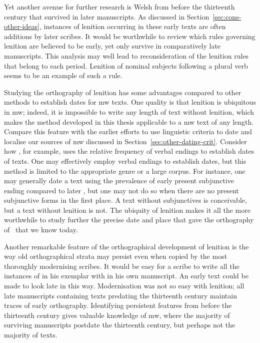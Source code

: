 Yet another avenue for further research is Welsh from before the thirteenth century that survived in later manuscripts. As discussed in Section~\ref{sec:cons-other-ideas}, instances of lenition occurring in these early texts are often additions by later scribes. It would be worthwhile to review which rules governing lenition are believed to be early, yet only survive in comparatively late manuscripts. This analysis may well lead to reconsideration of the lenition rules that belong to each period. Lenition of nominal subjects following a plural verb seems to be an example of such a rule.

Studying the orthography of lenition has some advantages compared to other methods to establish dates for \gls{mw} texts.
One quality is that lenition is ubiquitous in  \gls{mw}; indeed, it is impossible to write any length of text without lenition, which makes the method developed in this thesis applicable to a \gls{mw} text of any length. Compare  this feature with the earlier efforts to use linguistic criteria to date and localise our sources of \gls{mw} discussed in Section~\ref{sec:other-dating-crit}. Consider how \textcite{rodway_dating_2013}, for example, uses the relative frequency of verbal endings to establish dates of texts. One may  effectively employ verbal endings to establish dates, but this method is limited to the appropriate genre or a large corpus. For instance, one may generally date a text using the prevalence of early present subjunctive ending  compared to later , but one may not do so when there are no present subjunctive forms in the first place. A text without subjunctives is conceivable, but a text without lenition is not. The ubiquity of lenition makes it all the more worthwhile to study further the precise date and place that gave the orthography of \lT\ that we know today.

Another remarkable feature of the orthographical development of lenition is the way old orthographical strata may persist even when copied by the most thoroughly modernising scribes. It would be easy for a scribe to write all the instances of  in his exemplar  with  in his own manuscript. An early text could be made to look late in this way. Modernisation was not so easy with lenition; all late manuscripts containing texts predating the thirteenth century maintain traces of early orthography. Identifying persistent features from before the thirteenth century gives valuable knowledge of \gls{mw}, where the majority of surviving manuscripts postdate the thirteenth century, but perhaps not the majority of texts.

